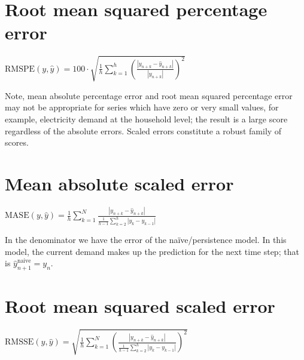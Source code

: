 \section{Root mean squared percentage error}\label{rmspe}
\begin{definition}
    $\mathrm{RMSPE}(y,\hat{y})=100\cdot\sqrt{\frac{1}{h}\sum\limits_{k=1}^{h} \left(\frac{|y_{n+k}-\hat{y}_{n+k}|}{|y_{n+k}|}\right)^2}$
\end{definition}
Note, mean absolute percentage error and root mean squared percentage error may not be appropriate for series which have zero or very small values, for example, electricity demand at the household level; the result is a large score regardless of the absolute errors.
Scaled errors constitute a robust family of scores.
\section{Mean absolute scaled error}\label{mase}
\begin{definition}
    $\mathrm{MASE}(y,\hat{y})=\frac{1}{h}\sum\limits_{k=1}^N\frac{|y_{n+k}-\hat{y}_{n+k}|}{\frac{1}{h-1}\sum\limits_{k=2}^{h}|y_{k}-y_{k-1}|}$
\end{definition}
In the denominator we have the error of the naïve/persistence model. 
In this model, the current demand makes up the prediction for the next time step; that is $\hat{y}^{\mathrm{naive}}_{n+1}=y_{n}$.
\section{Root mean squared scaled error}\label{rmsse}
\begin{definition}
    $\mathrm{RMSSE}(y,\hat{y})=\sqrt{\frac{1}{h}\sum\limits_{k=1}^N\left(\frac{|y_{n+k}-\hat{y}_{n+k}|}{\frac{1}{h-1}\sum\limits_{k=2}^{h}|y_{k}-y_{k-1}|}\right)^2}$
\end{definition}



